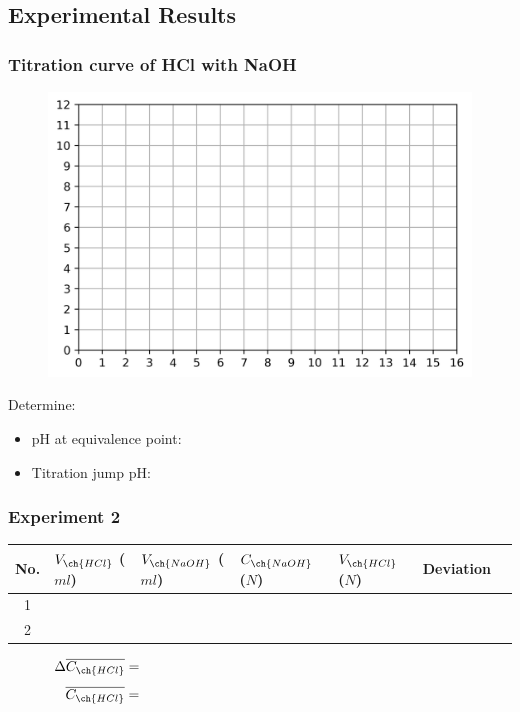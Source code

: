 \subsection{Experimental Results}

\subsubsection{Titration curve of HCl with NaOH}
\begin{figure}[ht]
	\centering
	\includegraphics[width=140mm]{chem}
\end{figure}
Determine:
\begin{itemize}[label=-]
	\item pH at equivalence point:
	\item Titration jump pH:
\end{itemize}

\subsubsection{Experiment 2}
\begin{table}[ht]
	\centering
	{\renewcommand{\arraystretch}{1.75}
	\begin{tabular}{|c|p{2cm}|p{2cm}|p{2cm}|p{2cm}|p{2cm}|p{2cm}|}
		\hline
		No. & $V_{\ch{HCl}}$ ($ml$)& $V_{\ch{NaOH}}$ ($ml$) & $C_{\ch{NaOH}}$ ($N$) & $V_{\ch{HCl}}$ ($N$) & Deviation \\ \hline
		1 & & & & & \\ \hline
		2 & & & & & \\ \hline
	\end{tabular}}	
\end{table}
\vspace{-0.1cm}
\[\Delta \overline{C_{\ch{HCl}}} = \hspace{8.3cm}\] \vspace{0cm}
\[\overline{C_{\ch{HCl}}} = \hspace{8cm}\]
\newpage
